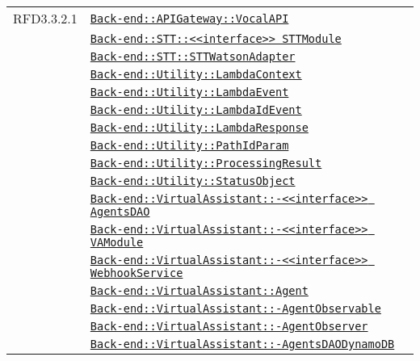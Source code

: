 \begin{longtable}{|>{\centering}m{3cm}|m{10cm}<{\centering}|}
RFD3.3.2.1 & \hyperref[Back-end::APIGateway::VocalAPI]{\texttt{Back-end::APIGateway::VocalAPI}}\\
& \hyperref[Back-end::STT::<<interface>> STTModule]{\texttt{Back-end::STT::<<interface>> STTModule}}\\
& \hyperref[Back-end::STT::STTWatsonAdapter]{\texttt{Back-end::STT::STTWatsonAdapter}}\\
& \hyperref[Back-end::Utility::LambdaContext]{\texttt{Back-end::Utility::LambdaContext}}\\
& \hyperref[Back-end::Utility::LambdaEvent]{\texttt{Back-end::Utility::LambdaEvent}}\\
& \hyperref[Back-end::Utility::LambdaIdEvent]{\texttt{Back-end::Utility::LambdaIdEvent}}\\
& \hyperref[Back-end::Utility::LambdaResponse]{\texttt{Back-end::Utility::LambdaResponse}}\\
& \hyperref[Back-end::Utility::PathIdParam]{\texttt{Back-end::Utility::PathIdParam}}\\
& \hyperref[Back-end::Utility::ProcessingResult]{\texttt{Back-end::Utility::ProcessingResult}}\\
& \hyperref[Back-end::Utility::StatusObject]{\texttt{Back-end::Utility::StatusObject}}\\
& \hyperref[Back-end::VirtualAssistant::<<interface>> AgentsDAO]{\texttt{Back-end::VirtualAssistant::-\linebreak <<interface>> AgentsDAO}}\\
& \hyperref[Back-end::VirtualAssistant::<<interface>> VAModule]{\texttt{Back-end::VirtualAssistant::-\linebreak <<interface>> VAModule}}\\
& \hyperref[Back-end::VirtualAssistant::<<interface>> WebhookService]{\texttt{Back-end::VirtualAssistant::-\linebreak <<interface>> WebhookService}}\\
& \hyperref[Back-end::VirtualAssistant::Agent]{\texttt{Back-end::VirtualAssistant::Agent}}\\
& \hyperref[Back-end::VirtualAssistant::AgentObservable]{\texttt{Back-end::VirtualAssistant::-\linebreak AgentObservable}}\\
& \hyperref[Back-end::VirtualAssistant::AgentObserver]{\texttt{Back-end::VirtualAssistant::-\linebreak AgentObserver}}\\
& \hyperref[Back-end::VirtualAssistant::AgentsDAODynamoDB]{\texttt{Back-end::VirtualAssistant::-\linebreak AgentsDAODynamoDB}}\\

\end{longtable}
